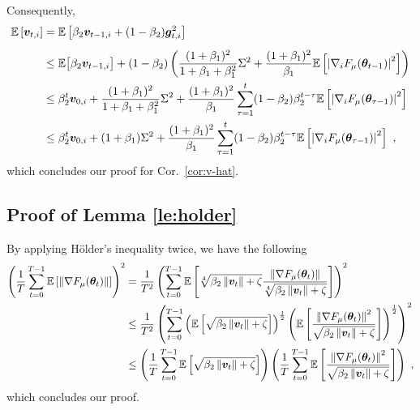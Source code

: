 \begin{appendices}
Consequently,
\begin{equation}
\begin{aligned}
\mathbb{E}\left[ {\bm{v}}_{t,i}\right]
&= \mathbb{E}\left[\beta_2 {\bm{v}}_{t-1,i} + (1-\beta_2){\bm{g}}^2_{t,i}\right] \\[5pt]
&\leq \mathbb{E}\big[\beta_2{\bm{v}}_{t-1,i}\big] + (1-\beta_2)\left(\frac{(1 + \beta_1)^2}{1 + \beta_1+\beta_1^2}\Sigma^2 + \frac{(1+\beta_1)^2}{\beta_1}\mathbb{E}\left[\left|\nabla_i F_{\mu}({\bm{\theta}}_{t-1})\right|^2\right]\right) \\
&\leq \beta_2^{t}{\bm{v}}_{0,i} + \frac{(1 + \beta_1)^2}{1 + \beta_1+\beta_1^2}\Sigma^2 + \frac{(1+\beta_1)^2}{\beta_1} \sum_{\tau=1}^{t}(1-\beta_2)\beta_2^{t-\tau}\mathbb{E}\left[\left|\nabla_i F_{\mu}({\bm{\theta}}_{\tau-1})\right|^2\right] \\
&\leq \beta_2^{t}{\bm{v}}_{0,i} + (1+\beta_1)\Sigma^2 + \frac{(1+\beta_1)^2}{\beta_1} \sum_{\tau=1}^{t}(1-\beta_2)\beta_2^{t-\tau}\mathbb{E}\left[\left|\nabla_i F_{\mu}({\bm{\theta}}_{\tau-1})\right|^2\right] \ ,
\end{aligned}
\end{equation}
which concludes our proof for Cor.~\ref{cor:v-hat}.

\subsection{Proof of Lemma \ref{le:holder}}\label{proof:holder}
By applying H\"{o}lder's inequality twice, we have the following
\begin{equation}
\begin{aligned}
\left(\frac{1}{T}\sum_{t=0}^{T-1}\mathbb{E}\left[\left\|\nabla
F_{\mu}({\bm{\theta}}_t)\right\|\right]\right)^2 &=\frac{1}{T^2}\left(\sum_{t=0}^{T-1}\mathbb{E}\left[\sqrt[4]{\beta_2\left\|{\bm{v}}_{t}\right\|+\zeta}\frac{\left\|\nabla
F_{\mu}({\bm{\theta}}_t)\right\|}{\sqrt[4]{\beta_2\left\|{\bm{v}}_{t}\right\|+\zeta}}\right]\right)^2 \\
&\leq \frac{1}{T^2}\left(\sum_{t=0}^{T-1}\left(\mathbb{E}\left[\sqrt{\beta_2\left\|{\bm{v}}_{t}\right\|+\zeta}\right]\right)^{\frac{1}{2}}\left(\mathbb{E}\left[\frac{\left\|\nabla
F_{\mu}({\bm{\theta}}_t)\right\|^2}{\sqrt{\beta_2\left\|{\bm{v}}_{t}\right\|+\zeta}}\right]\right)^{\frac{1}{2}}\right)^2 \\
&\leq \left(\frac{1}{T}\sum_{t=0}^{T-1} \mathbb{E}\left[\sqrt{\beta_2\left\|{\bm{v}}_{t}\right\|+\zeta}\right]\right)\left(\frac{1}{T}\sum_{t=0}^{T-1}\mathbb{E}\left[\frac{\left\|\nabla
F_{\mu}({\bm{\theta}}_t)\right\|^2}{\sqrt{\beta_2\left\|{\bm{v}}_{t}\right\|+\zeta}}\right]\right) \ ,
\end{aligned}
\end{equation}
which concludes our proof.


\end{appendices}
